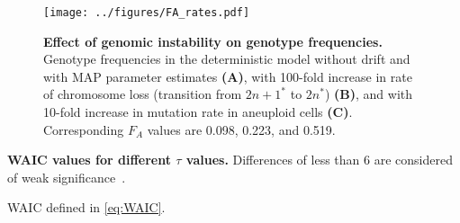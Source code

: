 \documentclass[12pt]{extarticle}
\begin{document}
\begin{figure}[p]
      \centering
      \texttt{[image: ../figures/FA\_rates.pdf]}      
	\caption{\textbf{Effect of genomic instability on genotype frequencies.}
	Genotype frequencies in the deterministic model without drift and with MAP parameter estimates \textbf{(A)}, with 100-fold increase in rate of chromosome loss (transition from $2n+1^*$ to $2n^*$) \textbf{(B)}, and with 10-fold increase in mutation rate in aneuploid cells \textbf{(C)}. Corresponding $F_A$ values are 0.098, 0.223, and 0.519.
	}
    \label{fig:FA_rates}
\end{figure}

\pagebreak


\begin{table}[h]
\centering
\caption{
\textbf{WAIC values for different $\tau$ values.}
Differences of less than 6 are considered of weak significance~\citep{Kass1995}.
}
\caption*{
	WAIC defined in \cref{eq:WAIC}.
} 
\label{table:WAIC}
\end{table}
\end{document}
